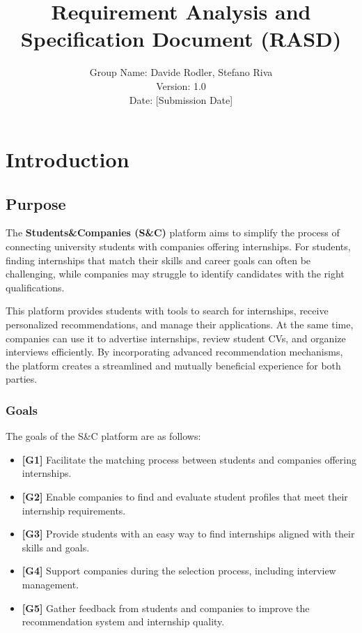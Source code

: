 \documentclass[12pt]{article}
\title{Requirement Analysis and Specification Document (RASD)}
\author{Group Name: Davide Rodler, Stefano Riva \\ Version: 1.0 \\ Date: [Submission Date]}
\date{}
\begin{document}
\maketitle

\tableofcontents

\section{Introduction}

\subsection{Purpose}
The \textbf{Students\&Companies (S\&C)} platform aims to simplify the process of connecting university students with companies offering internships. For students, finding internships that match their skills and career goals can often be challenging, while companies may struggle to identify candidates with the right qualifications.

This platform provides students with tools to search for internships, receive personalized recommendations, and manage their applications. At the same time, companies can use it to advertise internships, review student CVs, and organize interviews efficiently. By incorporating advanced recommendation mechanisms, the platform creates a streamlined and mutually beneficial experience for both parties.

\subsubsection{Goals}
The goals of the S\&C platform are as follows:
\begin{itemize}
    \item \textbf{[G1]} Facilitate the matching process between students and companies offering internships.
    \item \textbf{[G2]} Enable companies to find and evaluate student profiles that meet their internship requirements.
    \item \textbf{[G3]} Provide students with an easy way to find internships aligned with their skills and goals.
    \item \textbf{[G4]} Support companies during the selection process, including interview management.
    \item \textbf{[G5]} Gather feedback from students and companies to improve the recommendation system and internship quality.
\end{itemize}
\end{document}

